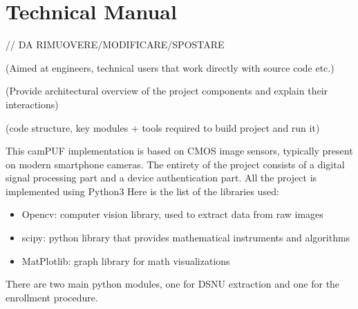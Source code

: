 \section{\textbf{Technical Manual}}

// DA RIMUOVERE/MODIFICARE/SPOSTARE

(Aimed at engineers, technical users that work directly with source code etc.)

(Provide architectural overview of the project components and explain their interactions)

(code structure, key modules + tools required to build project and run it)

This camPUF implementation is based on CMOS image sensors, typically present on modern smartphone cameras.
The entirety of the project consists of a digital signal processing part and a device authentication part.
All the project is implemented using Python3
Here is the list of the libraries used:

\begin{itemize}
\item Opencv: computer vision library, used to extract data from raw images
\item scipy: python library that provides mathematical instruments and algorithms
\item MatPlotlib: graph library for math visualizations
\end{itemize}

There are two main python modules, one for DSNU extraction and one for the enrollment procedure.
